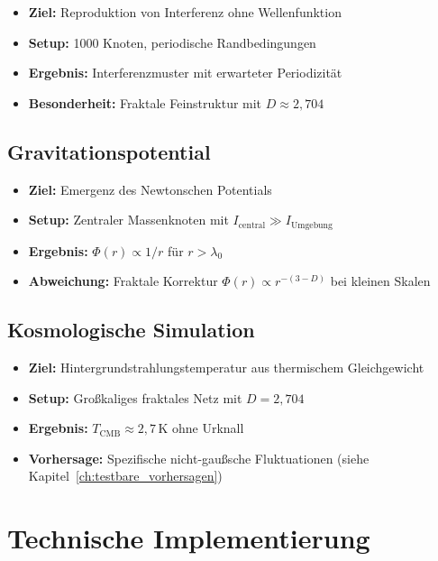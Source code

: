 \begin{itemize}
    \item \textbf{Ziel:} Reproduktion von Interferenz ohne Wellenfunktion
    \item \textbf{Setup:} 1000 Knoten, periodische Randbedingungen
    \item \textbf{Ergebnis:} Interferenzmuster mit erwarteter Periodizität
    \item \textbf{Besonderheit:} Fraktale Feinstruktur mit \( D \approx 2,704 \)
\end{itemize}

\subsection{Gravitationspotential}
\label{sub:numerik_gravitation}

\begin{itemize}
    \item \textbf{Ziel:} Emergenz des Newtonschen Potentials
    \item \textbf{Setup:} Zentraler Massenknoten mit \( I_{\text{central}} \gg I_{\text{Umgebung}} \)
    \item \textbf{Ergebnis:} \( \Phi(r) \propto 1/r \) für \( r > \lambda_0 \)
    \item \textbf{Abweichung:} Fraktale Korrektur \( \Phi(r) \propto r^{-(3-D)} \) bei kleinen Skalen
\end{itemize}

\subsection{Kosmologische Simulation}
\label{sub:numerik_kosmologie}

\begin{itemize}
    \item \textbf{Ziel:} Hintergrundstrahlungstemperatur aus thermischem Gleichgewicht
    \item \textbf{Setup:} Gro{\ss}kaliges fraktales Netz mit \( D = 2,704 \)
    \item \textbf{Ergebnis:} \( T_{\text{CMB}} \approx 2,7 \, \text{K} \) ohne Urknall
    \item \textbf{Vorhersage:} Spezifische nicht-gau{\ss}sche Fluktuationen (siehe Kapitel~\ref{ch:testbare_vorhersagen})
\end{itemize}

\section{Technische Implementierung}
\label{app:numerik_technik}

